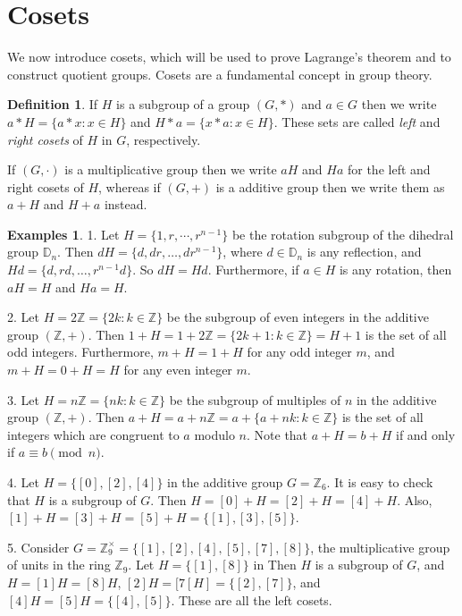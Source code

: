 \documentclass[11pt,oneside]{article}
\theoremstyle{definition}
\newtheorem{defn}[thm]{Definition}
\newtheorem{examples}[thm]{Examples}
\newcommand{\Z}{\mathbb{Z}} %
\newcommand{\D}{\mathbb{D}}
\begin{document}
\setcounter{section}{19}

\section{Cosets}\noindent
We now introduce cosets, which will be used to prove Lagrange's
theorem and to construct quotient groups. Cosets are a fundamental
concept in group theory.  


\begin{defn}\label{def:cosets} 
If $H$ is a subgroup of a group $(G,*)$ and $a \in G$ then we write
$a*H = \{a*x : x \in H\}$ and $H*a = \{x*a : x \in H\}$.  These sets
are called \emph{left} and \emph{right cosets} of $H$ in $G$,
respectively.

If $(G, \cdot)$ is a multiplicative group then we write $aH$ and $Ha$
for the left and right cosets of $H$, whereas if $(G, +)$ is a
additive group then we write them as $a+H$ and $H+a$ instead.
\end{defn}


\begin{examples}
1. Let $H = \{ 1, r, \cdots, r^{n-1} \}$ be the rotation subgroup of
the dihedral group $\D_n$. Then $dH = \{d, dr, \dots, dr^{n-1} \}$,
where $d \in \D_n$ is any reflection, and $Hd = \{d, rd, \dots,
r^{n-1}d \}$. So $dH = Hd$. Furthermore, if $a \in H$ is any rotation,
then $aH = H$ and $Ha = H$.

2. Let $H = 2\Z = \{ 2k : k \in \Z\}$ be the subgroup of even integers
in the additive group $(\Z,+)$. Then $1+H = 1+2\Z = \{ 2k+1 : k \in \Z
\} = H+1$ is the set of all odd integers. Furthermore, $m + H = 1+H$
for any odd integer $m$, and $m+H = 0+H = H$ for any even integer $m$.

3. Let $H = n\Z = \{ nk : k \in \Z \}$ be the subgroup of multiples of
$n$ in the additive group $(\Z,+)$. Then $a+H = a + n\Z = a + \{a+nk :
k \in \Z \}$ is the set of all integers which are congruent to $a$
modulo $n$. Note that $a+H = b+H$ if and only if $a \equiv b
\pmod{n}$.

4. Let $H = \{[0], [2], [4]\}$ in the additive group $G=\Z_6$. It is
easy to check that $H$ is a subgroup of $G$. Then $H = [0]+H = [2]+H =
[4]+H$. Also, $[1]+H = [3]+H = [5]+H = \{[1],[3], [5] \}$.

5. Consider $G=\Z_9^\times = \{[1], [2], [4], [5], [7], [8] \}$, the
multiplicative group of units in the ring $\Z_9$. Let $H =
\{[1],[8]\}$ in Then $H$ is a subgroup of $G$, and $H = [1]H = [8]H$,
$[2]H = [7[H] = \{[2],[7]\}$, and $[4]H = [5]H = \{[4],[5]\}$. These
  are all the left cosets.
\end{examples}
\end{document}
